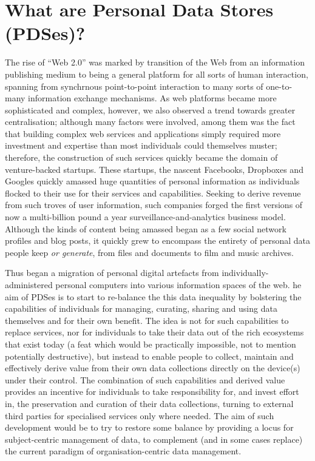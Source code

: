 \documentclass{acm_proc_article-sp}
\begin{document}
\section{What are Personal Data Stores (PDSes)?}

The rise of ``Web 2.0''  was marked by transition of the Web from an information publishing medium to being a general platform for all sorts of human interaction, spanning from synchrnous point-to-point interaction to many sorts of one-to-many information exchange mechanisms.  As web platforms became more sophisticated and complex, however, we also observed a trend towards greater centralisation; although many factors were involved, among them was the fact that building complex web services and applications simply required more investment and expertise than most individuals could themselves muster; therefore, the construction of such services quickly became the domain of venture-backed startups. These startups, the nascent Facebooks, Dropboxes and Googles quickly amassed huge quantities of personal information as individuals flocked to their use for their services and capabilities.  Seeking to derive revenue from such troves of user information, such companies forged the first versions of now a multi-billion pound a year surveillance-and-analytics business model.  Although the kinds of content being amassed began as a few social network profiles and blog posts, it quickly grew to encompass the entirety of personal data people keep {\em or generate}, from files and documents to film and music archives. 

Thus began a migration of personal digital artefacts from individually-administered personal computers into various information spaces of the web.  he aim of PDSes is to start to re-balance the this data inequality by bolstering the capabilities of individuals for managing, curating, sharing and using data themselves and for their own benefit.  The idea is not for such capabilities to replace services, nor for individuals to take their data out of the rich ecosystems that exist today (a feat which would be practically impossible, not to mention potentially destructive), but instead to enable people to collect, maintain and effectively derive value from their own data collections directly on the device(s) under their control.  The combination of such capabilities and derived value provides an incentive for individuals to take responsibility for, and invest effort in, the preservation and curation of their data collections, turning to external third parties for specialised services only where needed.  The aim of such development would be to try to restore some balance by providing a locus for subject-centric management of data, to complement (and in some cases replace) the current paradigm of organisation-centric data management.
\end{document}
